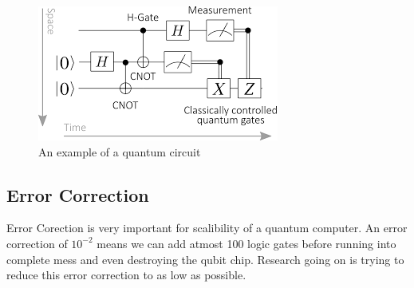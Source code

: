 \begin{figure}[!htb]
\centering
  \includegraphics{qcircuit}
  \caption{An example of a quantum circuit}
\end{figure}

\subsection{Error Correction}
Error Corection is very important for scalibility of a quantum computer. An error correction of $10^{-2}$ means we can add atmost 100 logic gates before running into complete mess and even destroying the qubit chip. Research going on is trying to reduce this error correction to as low as possible.





